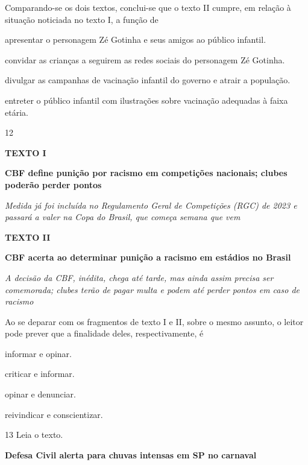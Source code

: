 Comparando-se os dois textos, conclui-se que o texto II cumpre, em
relação à situação noticiada no texto I, a função de

\begin{escolha}
\item apresentar o personagem Zé Gotinha e seus amigos ao público infantil.

\item convidar as crianças a seguirem as redes sociais do personagem Zé
Gotinha.

\item divulgar as campanhas de vacinação infantil do governo e atrair a
população.

\item entreter o público infantil com ilustrações sobre vacinação adequadas
à faixa etária.
\end{escolha}

\num{12}

\textbf{TEXTO I}

\textbf{CBF define punição por racismo em competições nacionais; clubes poderão perder pontos}

\textit{Medida já foi incluída no Regulamento Geral de Competições (RGC) de 2023 e passará a valer na Copa do Brasil, que começa semana que vem}


\textbf{TEXTO II}

\textbf{CBF acerta ao determinar punição a racismo em estádios no Brasil}

\textit{A decisão da CBF, inédita, chega até tarde, mas ainda assim precisa ser comemorada; clubes terão de pagar multa e podem até perder pontos em caso de racismo}

Ao se deparar com os fragmentos de texto I e II, sobre o mesmo assunto,
o leitor pode prever que a finalidade deles, respectivamente, é

\begin{escolha}
\item informar e opinar.

\item criticar e informar.

\item opinar e denunciar.

\item reivindicar e conscientizar.
\end{escolha}

\num{13} Leia o texto.

\textbf{Defesa Civil alerta para chuvas intensas em SP no carnaval}

